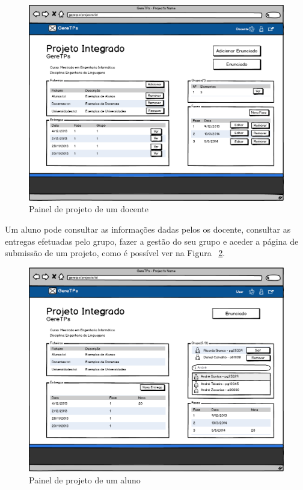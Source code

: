 \begin{figure}[H]
        \centering
        \includegraphics[width=1\textwidth]{images/prototipos/mockups/painelprojetodocente.png}
         \caption{Painel de projeto de um docente}
         \label{fig: painelprojetodocente}
\end{figure}

Um aluno pode consultar as informações dadas pelos os docente, consultar as entregas efetuadas pelo grupo, fazer a gestão do seu grupo e aceder a página de submissão de um projeto, como é possível ver na Figura ~\ref{fig: painelprojetoaluno}.\\

\begin{figure}[H]
        \centering
        \includegraphics[width=1\textwidth]{images/prototipos/mockups/painelprojetoaluno.png}
         \caption{Painel de projeto de um aluno}
         \label{fig: painelprojetoaluno}
\end{figure}

